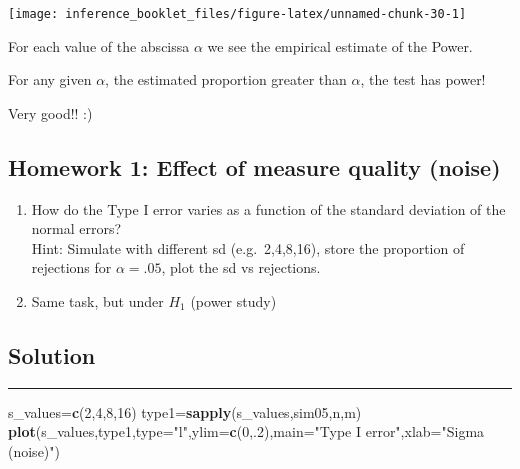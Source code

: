 \documentclass[]{article}
\newenvironment{Shaded}{\begin{snugshade}}{\end{snugshade}}
\newcommand{\KeywordTok}[1]{\textcolor[rgb]{0.13,0.29,0.53}{\textbf{#1}}}
\newcommand{\DataTypeTok}[1]{\textcolor[rgb]{0.13,0.29,0.53}{#1}}
\newcommand{\DecValTok}[1]{\textcolor[rgb]{0.00,0.00,0.81}{#1}}
\newcommand{\StringTok}[1]{\textcolor[rgb]{0.31,0.60,0.02}{#1}}
\newcommand{\ControlFlowTok}[1]{\textcolor[rgb]{0.13,0.29,0.53}{\textbf{#1}}}
\newcommand{\OperatorTok}[1]{\textcolor[rgb]{0.81,0.36,0.00}{\textbf{#1}}}
\newcommand{\NormalTok}[1]{#1}
\begin{document}
\begin{center}\texttt{[image: inference\_booklet\_files/figure-latex/unnamed-chunk-30-1]} \end{center}

For each value of the abscissa \(\alpha\) we see the empirical estimate
of the Power.

For any given \(\alpha\), the estimated proportion greater than
\(\alpha\), the test has power!

Very good!! :)

\subsection{Homework 1: Effect of measure quality
(noise)}\label{homework-1-effect-of-measure-quality-noise}

\begin{enumerate}
\def\labelenumi{\arabic{enumi}.}
\item
  How do the Type I error varies as a function of the standard deviation
  of the normal errors?\\
  Hint: Simulate with different sd (e.g.~2,4,8,16), store the proportion
  of rejections for \(\alpha=.05\), plot the sd vs rejections.
\item
  Same task, but under \(H_1\) (power study)
\end{enumerate}

\subsection{Solution}\label{solution}

\begin{Shaded}
\end{Shaded}

\begin{center}\rule{0.5\linewidth}{\linethickness}\end{center}

\begin{Shaded}
\begin{Highlighting}[]
\NormalTok{s_values=}\KeywordTok{c}\NormalTok{(}\DecValTok{2}\NormalTok{,}\DecValTok{4}\NormalTok{,}\DecValTok{8}\NormalTok{,}\DecValTok{16}\NormalTok{)}
\NormalTok{type1=}\KeywordTok{sapply}\NormalTok{(s_values,sim05,n,m)}
\KeywordTok{plot}\NormalTok{(s_values,type1,}\DataTypeTok{type=}\StringTok{"l"}\NormalTok{,}\DataTypeTok{ylim=}\KeywordTok{c}\NormalTok{(}\DecValTok{0}\NormalTok{,.}\DecValTok{2}\NormalTok{),}\DataTypeTok{main=}\StringTok{"Type I error"}\NormalTok{,}\DataTypeTok{xlab=}\StringTok{"Sigma (noise)"}\NormalTok{)}
\end{Highlighting}
\end{Shaded}
\end{document}
